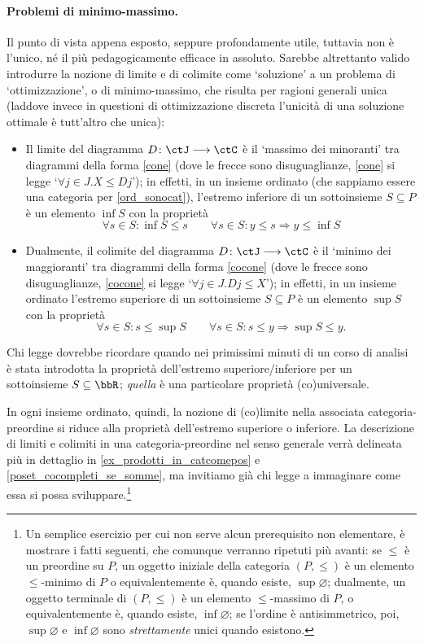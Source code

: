 \paragraph*{Problemi di minimo-massimo.}
Il punto di vista appena esposto, seppure profondamente utile, tuttavia non è l'unico, né il più pedagogicamente efficace in assoluto. Sarebbe altrettanto valido introdurre la nozione di limite e di colimite come `soluzione' a un problema di `ottimizzazione', o di minimo-massimo, che risulta per ragioni generali unica (laddove invece in questioni di ottimizzazione discreta l'unicità di una soluzione ottimale è tutt'altro che unica):
\begin{itemize}
 \item Il limite del diagramma \(D \colon \ctJ\fun\ctC\) è il `massimo dei minoranti' tra diagrammi della forma \eqref{cone} (dove le frecce sono disuguaglianze, \eqref{cone} si legge `$\forall j \in J . X \le Dj$'); in effetti, in un insieme ordinato (che sappiamo essere una categoria per \ref{ord_sonocat}), l'estremo inferiore di un sottoinsieme \(S\subseteq P\) è un elemento \(\inf S\) con la proprietà
       \[\forall s\in S : \inf S \le s\qquad \forall s\in S : y\le s \Rightarrow y\le \inf S\]
 \item Dualmente, il colimite del diagramma \(D \colon \ctJ\fun\ctC\) è il `minimo dei maggioranti' tra diagrammi della forma \eqref{cocone} (dove le frecce sono disuguaglianze, \eqref{cocone} si legge `$\forall j \in J . Dj \le X$'); in effetti, in un insieme ordinato l'estremo superiore di un sottoinsieme \(S\subseteq P\) è un elemento \(\sup S\) con la proprietà
       \[\forall s\in S : s\le\sup S \qquad \forall s\in S : s\le y \Rightarrow \sup S\le y.\]
\end{itemize}
\begin{remark}\label{supinf_are_univ}
 Chi legge dovrebbe ricordare quando nei primissimi minuti di un corso di analisi è stata introdotta la proprietà dell'estremo superiore/inferiore per un sottoinsieme \(S\subseteq\bbR\); \emph{quella} è una particolare proprietà (co)universale.
\end{remark}
In ogni insieme ordinato, quindi, la nozione di (co)limite nella associata categoria-preordine si riduce alla proprietà dell'estremo superiore	o inferiore. La descrizione di limiti e colimiti in una categoria-preordine nel senso generale verrà delineata più in dettaglio in \ref{ex_prodotti_in_catcomepos} e \ref{poset_cocompleti_se_somme}, ma invitiamo già chi legge a immaginare come essa si possa sviluppare.\footnote{Un semplice esercizio per cui non serve alcun prerequisito	non elementare, è mostrare i fatti seguenti, che comunque verranno ripetuti più avanti: se \(\le\) è un preordine su \(P\), un oggetto iniziale della categoria \((P,\le)\) è un elemento \(\le\)-minimo di \(P\) o equivalentemente è, quando esiste, \(\sup \varnothing\); dualmente, un oggetto terminale di \((P,\le)\) è un elemento \(\le\)-massimo di \(P\), o equivalentemente è, quando esiste, \(\inf\varnothing\); se l'ordine è antisimmetrico, poi, \(\sup\varnothing\) e \(\inf\varnothing\) sono \emph{strettamente} unici quando esistono.}

